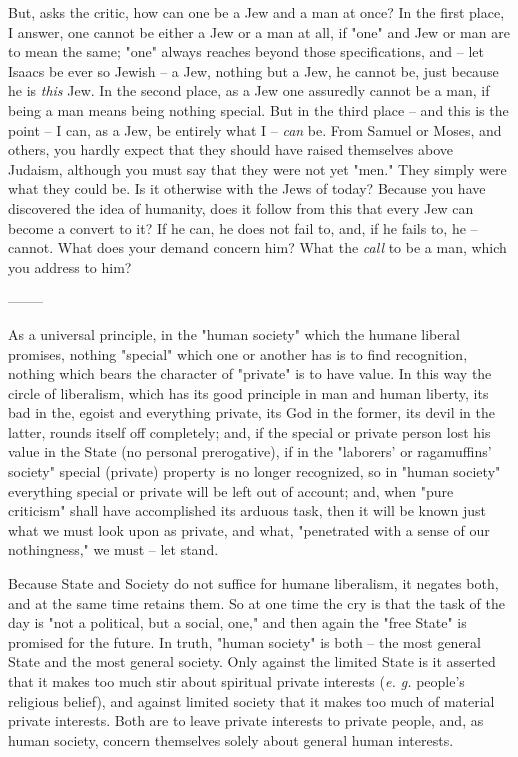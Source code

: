 \documentclass[a4paper]{book}
\begin{document}
But, asks the critic, how can one be a Jew and a man at once? In the first 
place, I answer, one cannot be either a Jew or a man at all, if "{}one"{} and 
Jew or man are to mean the same; "{}one"{} always reaches beyond those 
specifications, and -- let Isaacs be ever so Jewish -- a Jew, nothing but a 
Jew, he cannot be, just because he is \textit{this} Jew. In the second place, 
as a Jew one assuredly cannot be a man, if being a man means being nothing 
special. But in the third place -- and this is the point -- I can, as a Jew, 
be entirely what I -- \textit{can} be. From Samuel or Moses, and others, you 
hardly expect that they should have raised themselves above Judaism, although 
you must say that they were not yet "{}men."{} They simply were what they 
could be. Is it otherwise with the Jews of today? Because you have discovered 
the idea of humanity, does it follow from this that every Jew can become a 
convert to it? If he can, he does not fail to, and, if he fails to, he -- 
cannot. What does your demand concern him? What the \textit{call} to be a man, 
which you address to him?

\begin{center}
--------\end{center}


As a universal principle, in the "{}human society"{} which the humane liberal 
promises, nothing "{}special"{} which one or another has is to find 
recognition, nothing which bears the character of "{}private"{} is to have 
value. In this way the circle of liberalism, which has its good principle in 
man and human liberty, its bad in the, egoist and everything private, its God 
in the former, its devil in the latter, rounds itself off completely; and, if 
the special or private person lost his value in the State (no personal 
prerogative), if in the "{}laborers' or ragamuffins' society"{} special 
(private) property is no longer recognized, so in "{}human society"{} 
everything special or private will be left out of account; and, when "{}pure 
criticism"{} shall have accomplished its arduous task, then it will be known 
just what we must look upon as private, and what, "{}penetrated with a sense 
of our nothingness,"{} we must -- let stand.

Because State and Society do not suffice for humane liberalism, it negates 
both, and at the same time retains them. So at one time the cry is that the 
task of the day is "{}not a political, but a social, one,"{} and then again 
the "{}free State"{} is promised for the future. In truth, "{}human society"{} 
is both -- the most general State and the most general society. Only against 
the limited State is it asserted that it makes too much stir about spiritual 
private interests (\textit{e. g.} people's religious belief), and against 
limited society that it makes too much of material private interests. Both are 
to leave private interests to private people, and, as human society, concern 
themselves solely about general human interests.
\end{document}

